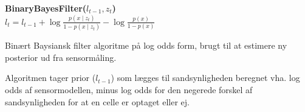 \begin{algorithm}[h]
\textbf{BinaryBayesFilter($l_{t-1}, z_t$)} \\
\Indp $l_t = l_{t-1} + \log \frac{p(x \mid z_t)}{1-p(x \mid z_t)} - \log \frac{p(x)}{1-p(x)}$ \\
\caption{Binært Baysiansk filter algoritme på log odds form, brugt til at estimere ny posterior ud fra sensormåling.}
\label{alg:binaerbayesfilter}
\end{algorithm}

Algoritmen tager prior ($l_{t-1}$) som lægges til sandsynligheden beregnet vha. log odds af sensormodellen, minus log odds for den negerede forskel 
af sandsynligheden for at en celle er optaget eller ej. \\ \\
\cite[s. 94]{probabilisticRobotics}



